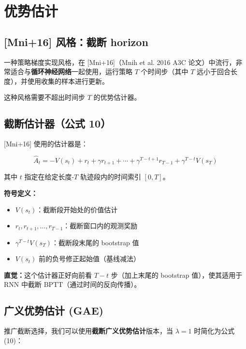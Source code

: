 \documentclass[12pt,a4paper]{article}
\theoremstyle{noteplain}
\theoremstyle{noteexercise}
\begin{document}
\section{优势估计}\label{sec:gae}

\subsection{[Mni+16] 风格：截断 horizon}

一种策略梯度实现风格，在 [Mni+16]（Mnih et al. 2016 A3C 论文）中流行，非常适合与\textbf{循环神经网络}一起使用，运行策略 $T$ 个时间步（其中 $T$ 远小于回合长度），并使用收集的样本进行更新。

这种风格需要不超出时间步 $T$ 的优势估计器。

\subsection{截断估计器（公式 10）}

[Mni+16] 使用的估计器是：

\begin{equation}\label{eq:truncated-adv}
  \hat{A}_t = -V(s_t) + r_t + \gamma r_{t+1} + \cdots + \gamma^{T-t+1} r_{T-1} + \gamma^{T-t} V(s_T)
\end{equation}

其中 $t$ 指定在给定长度-$T$ 轨迹段内的时间索引 $[0, T]$。

\textbf{符号定义：}
\begin{itemize}
  \setlength{\itemsep}{0.2em}
  \item $V(s_t)$：截断段开始处的价值估计
  \item $r_t, r_{t+1}, \ldots, r_{T-1}$：截断窗口内的观测奖励
  \item $\gamma^{T-t} V(s_T)$：截断段末尾的 bootstrap 值
  \item $V(s_t)$ 前的负号修正起始值（基线减法）
\end{itemize}

\textbf{直觉：}这个估计器正好向前看 $T-t$ 步（加上末尾的 bootstrap 值），使其适用于 RNN 中截断 BPTT（通过时间的反向传播）。

\subsection{广义优势估计 (GAE)}

推广截断选择，我们可以使用\textbf{截断广义优势估计}版本，当 $\lambda = 1$ 时简化为公式 (10)：
\end{document}
